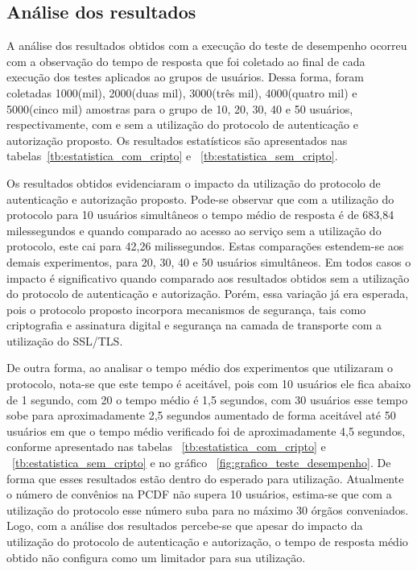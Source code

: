 \subsection{Análise dos resultados}

A análise dos resultados obtidos com a execução do teste de desempenho ocorreu com a observação do tempo de resposta que foi coletado ao final de cada execução dos testes aplicados ao grupos de usuários. Dessa forma, foram coletadas 1000(mil), 2000(duas mil), 3000(três mil), 4000(quatro mil) e 5000(cinco mil) amostras para o grupo de 10, 20, 30, 40 e 50 usuários, respectivamente, com e sem a utilização do protocolo de autenticação e autorização proposto. Os resultados estatísticos são apresentados nas tabelas~\ref{tb:estatistica_com_cripto} e ~\ref{tb:estatistica_sem_cripto}.

Os resultados obtidos evidenciaram o impacto da utilização do protocolo de autenticação e autorização proposto. Pode-se observar que com a utilização do protocolo para 10 usuários simultâneos o tempo médio de resposta é de 683,84 milessegundos e quando comparado ao acesso ao serviço sem a utilização do protocolo, este cai para 42,26 milissegundos. Estas comparações estendem-se aos demais experimentos, para 20, 30, 40 e 50 usuários simultâneos. Em todos casos o impacto é significativo quando comparado aos resultados obtidos sem a utilização do protocolo de autenticação e autorização. Porém, essa variação já era esperada, pois o protocolo proposto incorpora mecanismos de segurança, tais como criptografia e assinatura digital e segurança na camada de transporte com a utilização do SSL/TLS.

De outra forma, ao analisar o tempo médio dos experimentos que utilizaram o protocolo, nota-se que este tempo é aceitável, pois com 10 usuários ele fica abaixo de 1 segundo, com 20 o tempo médio é 1,5 segundos, com 30 usuários esse tempo sobe para aproximadamente 2,5 segundos aumentado de forma aceitável até 50 usuários em que o tempo médio verificado foi de aproximadamente 4,5 segundos, conforme apresentado nas tabelas ~\ref{tb:estatistica_com_cripto} e ~\ref{tb:estatistica_sem_cripto} e no gráfico ~\ref{fig:grafico_teste_desempenho}. De forma que esses resultados estão dentro do esperado para utilização. Atualmente o número de convênios na PCDF não supera 10 usuários, estima-se que com a utilização do protocolo esse número suba para no máximo 30 órgãos conveniados. Logo, com a análise dos resultados percebe-se que apesar do impacto da utilização do protocolo de autenticação e autorização, o tempo de resposta médio obtido não configura como um limitador para sua utilização.


